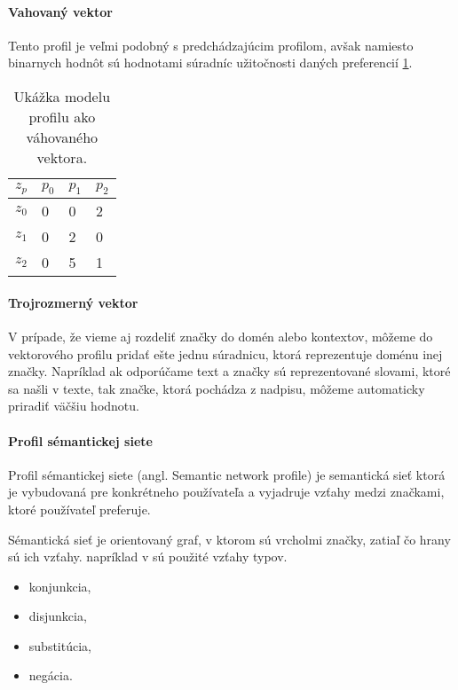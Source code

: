 \paragraph{Vahovaný vektor}

Tento profil je veľmi podobný s predchádzajúcim profilom, avšak namiesto binarnych 
hodnôt sú hodnotami súradníc užitočnosti daných preferencií \ref{table:weightprofile}.

\begin{table}[h]
\begin{center}
\begin{tabular}{|l|l|l|l|}
\hline
\(z_p\)  & \(p_0\) & \(p_1\) & \(p_2\) \\ \hline
\(z_0\) & 0     & 0        & 2        \\ \hline
\(z_1\) & 0     & 2        & 0        \\ \hline
\(z_2\) & 0     & 5        & 1        \\ \hline
\end{tabular}
\end{center}
\caption{Ukážka modelu profilu ako váhovaného vektora.}
\label{table:weightprofile}
\end{table}

\paragraph{Trojrozmerný vektor}

V prípade, že vieme aj rozdeliť značky do domén alebo kontextov,
môžeme do vektorového profilu pridať ešte jednu súradnicu, ktorá reprezentuje
doménu inej značky. Napríklad ak odporúčame text a značky sú
reprezentované slovami, ktoré sa našli v texte, tak značke, ktorá pochádza 
z nadpisu, môžeme automaticky priradiť väčšiu hodnotu.

\paragraph{Profil sémantickej siete}

Profil sémantickej siete (angl. Semantic network profile) je semantická sieť
ktorá je vybudovaná pre konkrétneho používateľa a vyjadruje vzťahy medzi značkami,
ktoré používateľ preferuje.


Sémantická sieť\cite{semantic_networks} je orientovaný graf, v ktorom sú vrcholmi značky,
zatiaľ čo hrany sú ich vzťahy.
napríklad v \cite{basic_user_profiles} sú použité vzťahy typov.

\begin{itemize}
\item{konjunkcia,}
\item{disjunkcia,}
\item{substitúcia,}
\item{negácia.}
\end{itemize}

